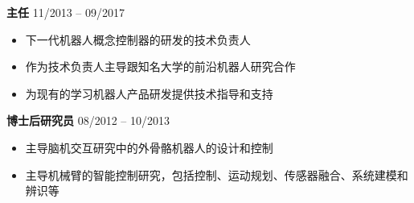 \documentclass[UTF8,nofonts]{res}
\begin{document}
\begin{resume}
\begin{list}{}{\setlength\leftmargin{0in}\setlength\topsep{0.15in}}
\item {}  {\bf 主任} \hfill 11/2013 -- 09/2017
\begin{itemize}
	\item 下一代机器人概念控制器的研发的技术负责人
	\item 作为技术负责人主导跟知名大学的前沿机器人研究合作
	\item 为现有的学习机器人产品研发提供技术指导和支持
\end{itemize}

\item {}  {\bf 博士后研究员}  \hfill 08/2012 -- 10/2013
\begin{itemize}
	\item 主导脑机交互研究中的外骨骼机器人的设计和控制
	\item 主导机械臂的智能控制研究，包括控制、运动规划、传感器融合、系统建模和辨识等
\end{itemize}







\end{list}
\end{resume}
\end{document}
